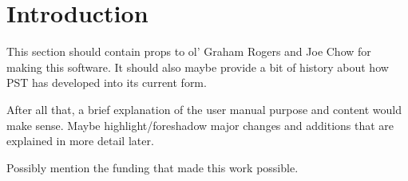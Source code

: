 \vspace{2em} %
\chapter*{Introduction}

This section should contain props to ol' Graham Rogers and Joe Chow for making this software.
It should also maybe provide a bit of history about how PST has developed into its current form.

After all that, a brief explanation of the user manual purpose and content would make sense.
Maybe highlight/foreshadow major changes and additions that are explained in more detail later.

Possibly mention the funding that made this work possible.